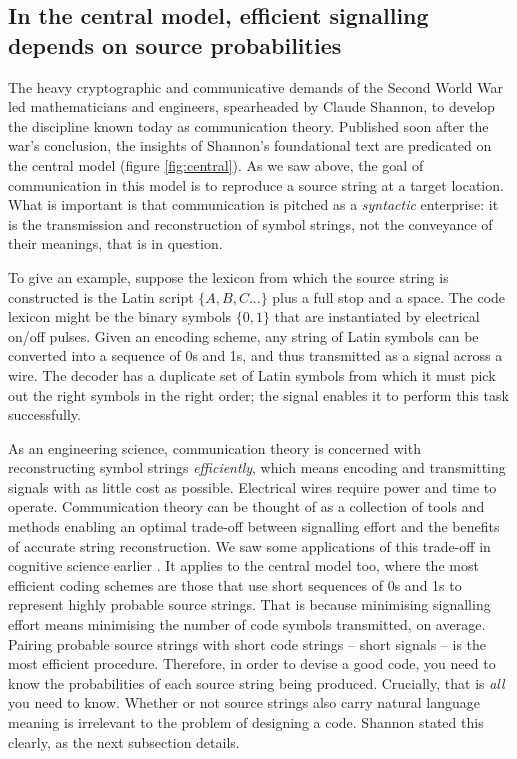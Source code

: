 \documentclass[12pt]{article}
\begin{document}

\subsection{In the central model, efficient signalling depends on source probabilities}
The heavy cryptographic and communicative demands of the Second World War led mathematicians and engineers, spearheaded by Claude Shannon, to develop the discipline known today as communication theory.
Published soon after the war's conclusion, the insights of Shannon's foundational text \parencite*{shannon1948mathematicalc} are predicated on the central model (figure \ref{fig:central}).
As we saw above, the goal of communication in this model is to reproduce a source string at a target location.
What is important is that communication is pitched as a \textit{syntactic} enterprise: it is the transmission and reconstruction of symbol strings, not the conveyance of their meanings, that is in question.

To give an example, suppose the lexicon from which the source string is constructed is the Latin script $\{A,B,C...\}$ plus a full stop and a space.
The code lexicon might be the binary symbols $\{0,1\}$ that are instantiated by electrical on/off pulses.
Given an encoding scheme, any string of Latin symbols can be converted into a sequence of 0s and 1s, and thus transmitted as a signal across a wire.
The decoder has a duplicate set of Latin symbols from which it must pick out the right symbols in the right order; the signal enables it to perform this task successfully.

As an engineering science, communication theory is concerned with reconstructing symbol strings \textit{efficiently}, which means encoding and transmitting signals with as little cost as possible.
Electrical wires require power and time to operate.
Communication theory can be thought of as a collection of tools and methods enabling an optimal trade-off between signalling effort and the benefits of accurate string reconstruction.
We saw some applications of this trade-off in cognitive science earlier \citep{martinez2019representations,martinez2019deception,sims2016ratedistortion}.
It applies to the central model too, where the most efficient coding schemes are those that use short sequences of 0s and 1s to represent highly probable source strings.
That is because minimising signalling effort means minimising the number of code symbols transmitted, on average.
Pairing probable source strings with short code strings -- short signals -- is the most efficient procedure.
Therefore, in order to devise a good code, you need to know the probabilities of each source string being produced.
Crucially, that is \textit{all} you need to know.
Whether or not source strings also carry natural language meaning is irrelevant to the problem of designing a code.
Shannon stated this clearly, as the next subsection details.
\end{document}
